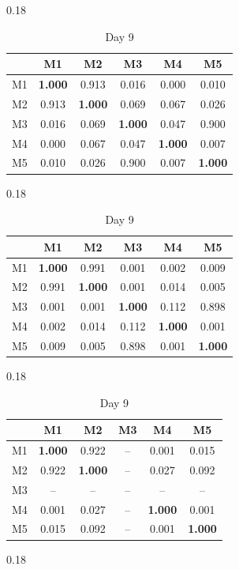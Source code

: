 \begin{table}[htbp]
\hfill
\begin{subtable}[t]{0.18\linewidth}
\centering
\caption*{Day 7}
\begin{tabular}{cccccc}
\toprule
& M1 & M2 & M3 & M4 & M5 \\
\midrule
M1 & \textbf{1.000} & 0.913 & 0.016 & 0.000 & 0.010 \\
M2 & 0.913 & \textbf{1.000} & 0.069 & 0.067 & 0.026 \\
M3 & 0.016 & 0.069 & \textbf{1.000} & 0.047 & 0.900 \\
M4 & 0.000 & 0.067 & 0.047 & \textbf{1.000} & 0.007 \\
M5 & 0.010 & 0.026 & 0.900 & 0.007 & \textbf{1.000} \\
\bottomrule
\end{tabular}
\end{subtable}
\hfill
\begin{subtable}[t]{0.18\linewidth}
\centering
\caption*{Day 8}
\begin{tabular}{cccccc}
\toprule
& M1 & M2 & M3 & M4 & M5 \\
\midrule
M1 & \textbf{1.000} & 0.991 & 0.001 & 0.002 & 0.009 \\
M2 & 0.991 & \textbf{1.000} & 0.001 & 0.014 & 0.005 \\
M3 & 0.001 & 0.001 & \textbf{1.000} & 0.112 & 0.898 \\
M4 & 0.002 & 0.014 & 0.112 & \textbf{1.000} & 0.001 \\
M5 & 0.009 & 0.005 & 0.898 & 0.001 & \textbf{1.000} \\
\bottomrule
\end{tabular}
\end{subtable}
\hfill
\begin{subtable}[t]{0.18\linewidth}
\centering
\caption*{Day 9}
\begin{tabular}{cccccc}
\toprule
& M1 & M2 & M3 & M4 & M5 \\
\midrule
M1 & \textbf{1.000} & 0.922 & -- & 0.001 & 0.015 \\
M2 & 0.922 & \textbf{1.000} & -- & 0.027 & 0.092 \\
M3 & -- & -- & -- & -- & -- \\
M4 & 0.001 & 0.027 & -- & \textbf{1.000} & 0.001 \\
M5 & 0.015 & 0.092 & -- & 0.001 & \textbf{1.000} \\
\bottomrule
\end{tabular}
\end{subtable}
\hfill
\begin{subtable}[t]{0.18\linewidth}

\end{subtable}
\end{table}
